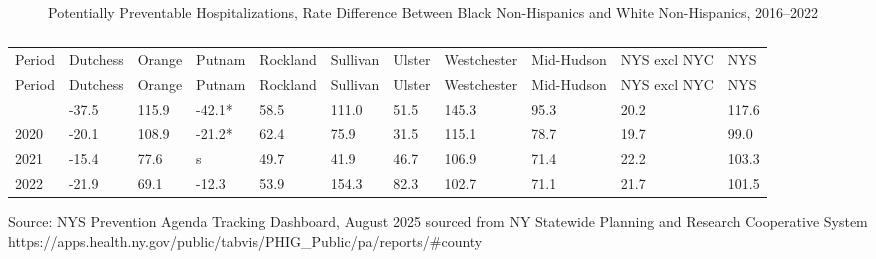 \documentclass[
  english,
  letterpaper,
]{report}
\begin{document}
\begin{figure}


\caption{\label{fig-pph-black-white-nh}Potentially Preventable
Hospitalizations, Rate Difference Between Black Non-Hispanics and White
Non-Hispanics, 2016--2022}

\end{figure}%

\begin{longtable}[]{@{}lllllllllll@{}}

\caption{\label{tbl-pph-black-white-nh}Potentially Preventable
Hospitalizations, Rate Difference Between Black Non-Hispanics and White
Non-Hispanics, 2016--2022}

\tabularnewline

\caption{}\label{T_fda6f}\tabularnewline
\toprule\noalign{}
Period & Dutchess & Orange & Putnam & Rockland & Sullivan & Ulster &
Westchester & Mid-Hudson & NYS excl NYC & NYS \\
\midrule\noalign{}
\endfirsthead
\toprule\noalign{}
Period & Dutchess & Orange & Putnam & Rockland & Sullivan & Ulster &
Westchester & Mid-Hudson & NYS excl NYC & NYS \\
\midrule\noalign{}
\endhead
\bottomrule\noalign{}
\endlastfoot
2019 & -37.5 & 115.9 & -42.1* & 58.5 & 111.0 & 51.5 & 145.3 & 95.3 &
20.2 & 117.6 \\
2020 & -20.1 & 108.9 & -21.2* & 62.4 & 75.9 & 31.5 & 115.1 & 78.7 & 19.7
& 99.0 \\
2021 & -15.4 & 77.6 & s & 49.7 & 41.9 & 46.7 & 106.9 & 71.4 & 22.2 &
103.3 \\
2022 & -21.9 & 69.1 & -12.3 & 53.9 & 154.3 & 82.3 & 102.7 & 71.1 & 21.7
& 101.5 \\

\end{longtable}

\begin{tcolorbox}[enhanced jigsaw, breakable, leftrule=.75mm, title=\textcolor{quarto-callout-note-color}{\faInfo}\hspace{0.5em}{Source}, bottomrule=.15mm, opacityback=0, left=2mm, colback=white, bottomtitle=1mm, coltitle=black, colbacktitle=quarto-callout-note-color!10!white, colframe=quarto-callout-note-color-frame, opacitybacktitle=0.6, toptitle=1mm, titlerule=0mm, arc=.35mm, rightrule=.15mm, toprule=.15mm]

Source: NYS Prevention Agenda Tracking Dashboard, August 2025 sourced
from NY Statewide Planning and Research Cooperative System
https://apps.health.ny.gov/public/tabvis/PHIG\_Public/pa/reports/\#county

\end{tcolorbox}
\end{document}
